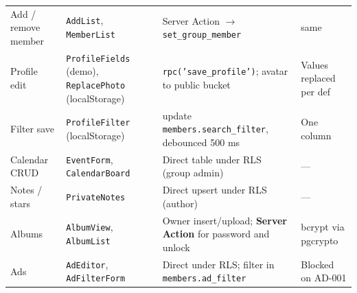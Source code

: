 \documentclass[11pt,a4paper]{article}
\newcommand{\code}[1]{\texttt{\small #1}}
\begin{document}
{\begin{longtable}{L{2.6cm} L{3.4cm} L{4.6cm} L{4.2cm}}
Add / remove member & \code{AddList}, \code{MemberList} & Server Action $\rightarrow$ \code{set\_group\_member} & same\\
Profile edit & \code{ProfileFields} (demo), \code{ReplacePhoto} (localStorage) & \code{rpc('save\_profile')}; avatar to public bucket & Values replaced per def\\
Filter save & \code{ProfileFilter} (localStorage) & update \code{members.search\_filter}, debounced 500 ms & One column\\
Calendar CRUD & \code{EventForm}, \code{CalendarBoard} & Direct table under RLS (group admin) & ---\\
Notes / stars & \code{PrivateNotes} & Direct upsert under RLS (author) & ---\\
Albums & \code{AlbumView}, \code{AlbumList} & Owner insert/upload; \textbf{Server Action} for password and unlock & bcrypt via pgcrypto\\
Ads & \code{AdEditor}, \code{AdFilterForm} & Direct under RLS; filter in \code{members.ad\_filter} & Blocked on AD-001\\
\end{longtable}
}
\end{document}
